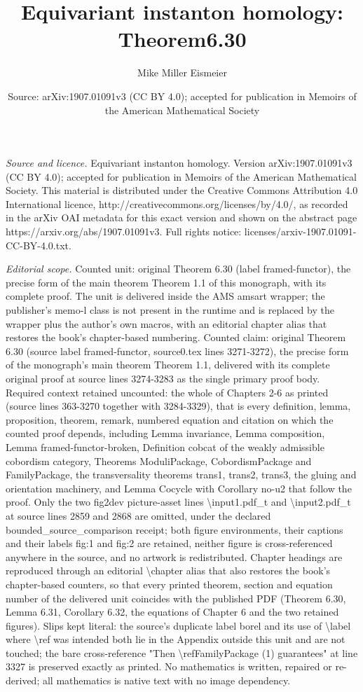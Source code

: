 \documentclass[10pt,a4paper]{amsart}
\title[Functoriality of framed equivariant instanton homology on th]{Equivariant instanton homology: Theorem6.30}
\author{Mike Miller Eismeier}
\date{Source: arXiv:1907.01091v3 (CC BY 4.0); accepted for publication in Memoirs of the American Mathematical Society}
\theoremstyle{definition}
\theoremstyle{remark}
\numberwithin{figure}{qchap}
\begin{document}
\maketitle
\noindent\emph{Source and licence.} Equivariant instanton homology. Version arXiv:1907.01091v3 (CC BY 4.0); accepted for publication in Memoirs of the American Mathematical Society. This material is distributed under the Creative Commons Attribution 4.0 International licence, http://creativecommons.org/licenses/by/4.0/, as recorded in the arXiv OAI metadata for this exact version and shown on the abstract page https://arxiv.org/abs/1907.01091v3. Full rights notice: licenses/arxiv-1907.01091-CC-BY-4.0.txt.\par\smallskip
\noindent\textit{Editorial scope.} Counted unit: original Theorem 6.30 (label framed-functor), the precise form of the main theorem Theorem 1.1 of this monograph, with its complete proof. The unit is delivered inside the AMS amsart wrapper; the publisher's memo-l class is not present in the runtime and is replaced by the wrapper plus the author's own macros, with an editorial chapter alias that restores the book's chapter-based numbering. Counted claim: original Theorem 6.30 (source label framed-functor, source0.tex lines 3271-3272), the precise form of the monograph's main theorem Theorem 1.1, delivered with its complete original proof at source lines 3274-3283 as the single primary proof body. Required context retained uncounted: the whole of Chapters 2-6 as printed (source lines 363-3270 together with 3284-3329), that is every definition, lemma, proposition, theorem, remark, numbered equation and citation on which the counted proof depends, including Lemma invariance, Lemma composition, Lemma framed-functor-broken, Definition cobcat of the weakly admissible cobordism category, Theorems ModuliPackage, CobordismPackage and FamilyPackage, the transversality theorems trans1, trans2, trans3, the gluing and orientation machinery, and Lemma Cocycle with Corollary no-u2 that follow the proof. Only the two fig2dev picture-asset lines \textbackslash{}input{1.pdf\_t} and \textbackslash{}input{2.pdf\_t} at source lines 2859 and 2868 are omitted, under the declared bounded\_source\_comparison receipt; both figure environments, their captions and their labels fig:1 and fig:2 are retained, neither figure is cross-referenced anywhere in the source, and no artwork is redistributed. Chapter headings are reproduced through an editorial \textbackslash{}chapter alias that also restores the book's chapter-based counters, so that every printed theorem, section and equation number of the delivered unit coincides with the published PDF (Theorem 6.30, Lemma 6.31, Corollary 6.32, the equations of Chapter 6 and the two retained figures). Slips kept literal: the source's duplicate label borel and its use of \textbackslash{}label where \textbackslash{}ref was intended both lie in the Appendix outside this unit and are not touched; the bare cross-reference "Then \textbackslash{}ref{FamilyPackage} (1) guarantees" at line 3327 is preserved exactly as printed. No mathematics is written, repaired or re-derived; all mathematics is native text with no image dependency.
\end{document}
